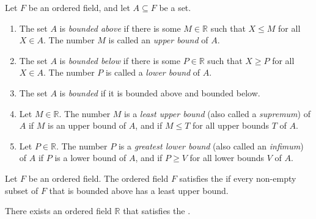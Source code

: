 \begin{definition} %
	\label{rax:d:bound}
	Let $F$ be an ordered field, and let $A \subseteq F$ be a set.
	\begin{enumerate}
		\item The set $A$ is \emph{bounded above} if there is some $M \in \mathbb{R}$ such that $X \leq M$ for all $X \in A$. The number $M$ is called an \emph{upper bound} of $A$.
		\item The set $A$ is \emph{bounded below} if there is some $P \in \mathbb{R}$ such that $X \geq P$ for all $X \in A$. The number $P$ is called a \emph{lower bound} of $A$.
		\item The set $A$ is \emph{bounded} if it is bounded above and bounded below.
		\item Let $M \in \mathbb{R}$. The number $M$ is a \emph{least upper bound} (also called a \emph{supremum}) of $A$ if $M$ is an upper bound of $A$, and if $M \leq T$ for all upper bounds $T$ of $A$.
		\item Let $P \in \mathbb{R}$. The number $P$ is a \emph{greatest lower bound} (also called an \emph{infimum}) of $A$ if $P$ is a lower bound of $A$, and if $P \geq V$ for all lower bounds $V$ of $A$.
	\end{enumerate}
\end{definition}

\begin{definition} %
	Let $F$ be an ordered field. The ordered field $F$ satisfies the \emph{} if every non-empty subset of $F$ that is bounded above has a least upper bound.
\end{definition}

\begin{axiom} %
	There exists an ordered field $\mathbb{R}$ that satisfies the .
\end{axiom}